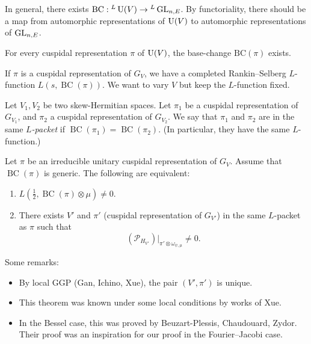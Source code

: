 \documentclass[reqno]{amsart} 
\begin{document}
In general, there exists $\mathrm{BC} : {}^L \operatorname{U}(V) \rightarrow {}^L \operatorname{GL}_{n, E}$.  By functoriality, there should be a map from automorphic representations of $\operatorname{U}(V)$ to automorphic representations of $\operatorname{GL}_{n, E}$.

\begin{theorem}
  For every cuspidal representation $\pi$ of $\operatorname{U}(V)$, the base-change $\mathrm{BC}(\pi)$ exists.
\end{theorem}

If $\pi$ is a cuspidal representation of $G_V$, we have a completed Rankin--Selberg $L$-function $L(s, \operatorname{BC}(\pi))$.  We want to vary $V$ but keep the $L$-function fixed.

\begin{definition}
  Let $V_1, V_2$ be two skew-Hermitian spaces.  Let $\pi_1$ be a cuspidal representation of $G_{V_1}$, and $\pi_2$ a cuspidal representation of $G_{V_2}$.  We say that $\pi_1$ and $\pi_2$ are in the same $L$\emph{-packet} if $\operatorname{BC}(\pi_1) = \operatorname{BC}(\pi_2)$.  (In particular, they have the same $L$-function.)
\end{definition}
\begin{theorem}[B., Lu, Xue]\label{theorem:cnoj8qj2jg}
  Let $\pi$ be an irreducible unitary cuspidal representation of $G_{V}$.  Assume that $\operatorname{BC}(\pi)$ is generic.  The following are equivalent:
  \begin{enumerate}
  \item $L(\tfrac{1}{2}, \operatorname{BC}(\pi) \otimes \mu) \neq 0$.
  \item There exists $V'$ and $\pi '$ (cuspidal representation of $G_{V'}$) in the same $L$-packet as $\pi$ such that
    \begin{equation*}
      \left( \mathcal{P}_{H_{V '}} \right) |_{\pi ' \otimes \omega_{\psi, \mu}} \neq 0.
    \end{equation*}
  \end{enumerate}
\end{theorem}
Some remarks:
\begin{itemize}
\item By local GGP (Gan, Ichino, Xue), the pair $(V', \pi ')$ is unique.
\item This theorem was known under some local conditions by works of Xue.
\item In the Bessel case, this was proved by Beuzart-Plessis, Chaudouard, Zydor.  Their proof was an inspiration for our proof in the Fourier--Jacobi case.
\end{itemize}
\end{document}
